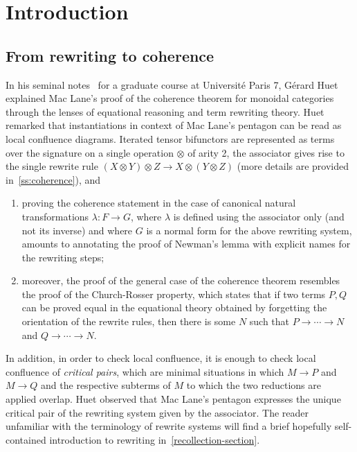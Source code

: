 
\section*{Introduction} 
\label{s:introduction}



\subsection*{From rewriting to coherence}
In his seminal notes~\cite{Huet-notes-cat} for a graduate course at Université Paris 7, Gérard Huet explained Mac Lane's proof of the coherence theorem for monoidal categories through the lenses of equational reasoning and  term rewriting theory. 
Huet remarked that instantiations in context of Mac Lane's pentagon can be read as local confluence diagrams. Iterated tensor bifunctors  are represented as terms over the signature on a single operation $\otimes$ of arity 2, the associator gives rise to the single rewrite rule $(X\otimes Y)\otimes Z\to X\otimes(Y\otimes Z)$ (more details are provided in~\cref{ss:coherence}), and
\begin{enumerate}
\item proving  the coherence statement in the case of canonical natural transformations $\lambda:F\rightarrow G$, where $\lambda$ is defined using the associator only (and not its inverse) and where $G$ is a normal form for the above rewriting system, amounts to annotating the proof of Newman's lemma with  explicit names for the rewriting steps;
\item moreover, the proof of the general case of the coherence theorem resembles the proof of the Church-Rosser property, which states that if two terms $P,Q$ can be proved equal in the equational theory obtained by forgetting the orientation of the rewrite rules, then there is some $N$ such that $P\rightarrow\cdots\rightarrow N$ and
$Q\rightarrow\cdots\rightarrow N$.
\end{enumerate}
In addition, in order to check local confluence, it is enough to check local confluence of {\em critical pairs}, which are minimal situations in which $M\rightarrow P$ and $M\rightarrow Q$ and the respective subterms of $M$ to which the two reductions are applied overlap. Huet observed that Mac Lane's pentagon expresses the unique critical pair of  the rewriting system given by the associator. The reader unfamiliar with the terminology of rewrite systems will find a brief hopefully self-contained introduction to rewriting in~\cref{recollection-section}.

